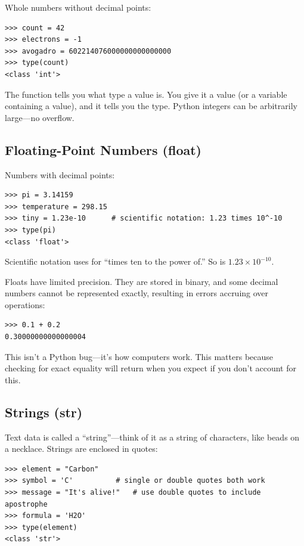Whole numbers without decimal points:

\begin{lstlisting}
>>> count = 42
>>> electrons = -1
>>> avogadro = 602214076000000000000000
>>> type(count)
<class 'int'>
\end{lstlisting}

The  function tells you what type a value is. You give it a value (or a variable containing a value), and it tells you the type. Python integers can be arbitrarily large---no overflow.

\subsection{Floating-Point Numbers (float)}
\label{subsec:floats}

Numbers with decimal points:

\begin{lstlisting}
>>> pi = 3.14159
>>> temperature = 298.15
>>> tiny = 1.23e-10      # scientific notation: 1.23 times 10^-10
>>> type(pi)
<class 'float'>
\end{lstlisting}

Scientific notation uses  for ``times ten to the power of.'' So  is $1.23 \times 10^{-10}$.

\begin{warning}
Floats have limited precision. They are stored in binary, and some decimal numbers cannot be represented exactly, resulting in errors accruing over operations:
\begin{lstlisting}
>>> 0.1 + 0.2
0.30000000000000004
\end{lstlisting}
This isn't a Python bug---it's how computers work. This matters because checking for exact equality will return  when you expect  if you don't account for this.
\end{warning}

\subsection{Strings (str)}

Text data is called a ``string''---think of it as a string of characters, like beads on a necklace. Strings are enclosed in quotes:

\begin{lstlisting}
>>> element = "Carbon"
>>> symbol = 'C'          # single or double quotes both work
>>> message = "It's alive!"   # use double quotes to include apostrophe
>>> formula = 'H2O'
>>> type(element)
<class 'str'>
\end{lstlisting}

